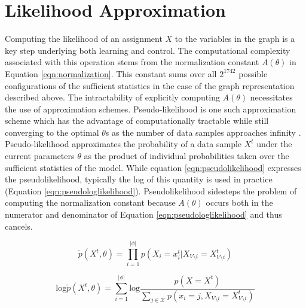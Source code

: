 \documentclass{article} %
\begin{document}
\section{Likelihood Approximation}
Computing the likelihood of an assignment $X$ to the variables in the graph is a key step underlying both learning and control. The computational complexity associated with this operation stems from the normalization constant $A(\theta)$ in Equation \ref{eqn:normalization}. This constant sums over all $2^{1742}$ possible configurations of the sufficient statistics in the case of the graph representation described above. The intractability of explicitly computing $A(\theta)$ necessitates the use of approximation schemes. Pseudo-likelihood is one such approximation scheme which has the advantage of computationally tractable while still converging to the optimal $\theta$s as the number of data samples approaches infinity \cite{besag75}. Pseudo-likelihood approximates the probability of a data sample $X^t$ under the current parameters $\theta$ as the product of individual probabilities taken over the sufficient statistics of the model. While equation \ref{eqn:pseudolikelihood} expresses the pseudolikelihood, typically the log of this quantity is used in practice (Equation \ref{eqn:pseudologlikelihood}). Pseudolikelihood sidesteps the problem of computing the normalization constant because $A(\theta)$ occurs both in the numerator and denominator of Equation \ref{eqn:pseudologlikelihood} and thus cancels.

\begin{equation}
\tilde{p}(X^t,\theta) = \prod_{i=1}^{|\phi|} p(X_i = x_i^t | X_{V\setminus i} = X_{V\setminus i}^t) 
\label{eqn:pseudolikelihood}
\end{equation}

\begin{equation}
\textrm{log}\tilde{p}(X^t,\theta) = \sum_{i=1}^{|\phi|} \textrm{log}\frac{p(X = X^t)}{\sum_{j \in \mathcal{X}} p(x_i = j, X_{V\setminus i} = X_{V\setminus i}^t)}
\label{eqn:pseudologlikelihood}
\end{equation}

\end{document}
